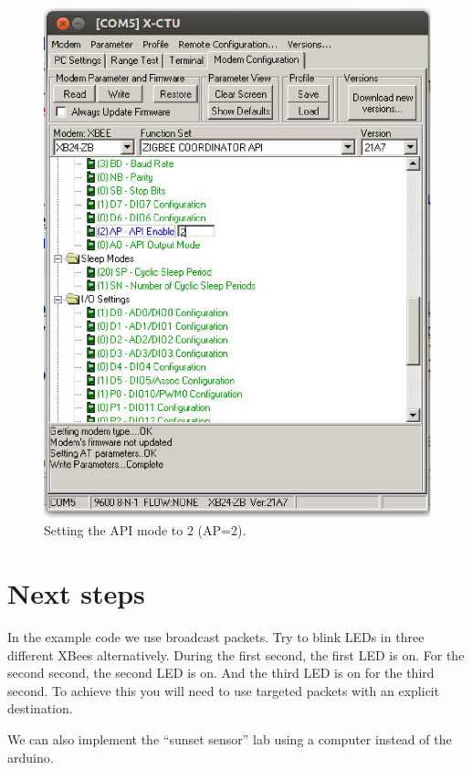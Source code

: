 \begin{figure}[htbp]
  \centering
  \includegraphics[width=0.85\linewidth]{figures/changingAPIMode.eps}
  \caption{Setting the API mode to 2 (AP=2).}
  \label{fig:changingAPIMode}
\end{figure}

\section{Next steps}
In the example code we use broadcast packets.
Try to blink LEDs in three different XBees alternatively. 
During the first second, the first LED is on.
For the second second, the second LED is on.
And the third LED is on for the third second.
To achieve this you will need to use targeted packets with an explicit destination.

We can also implement the ``sunset sensor'' lab using a computer instead of the arduino.
